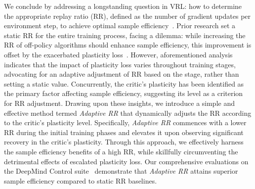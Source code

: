 We conclude by addressing a longstanding question in VRL: how to determine the appropriate replay ratio (RR), defined as the number of gradient updates per environment step, to achieve optimal sample efficiency~\citep{fedus2020revisiting}.
Prior research set a static RR for the entire training process, facing a dilemma: while increasing the RR of off-policy algorithms should enhance sample efficiency, this improvement is offset by the exacerbated plasticity loss~\citep{primacy_bias, dormant_neuron, BBF}.
However, aforementioned analysis indicates that the impact of plasticity loss varies throughout training stages, advocating for an adaptive adjustment of RR based on the stage, rather than setting a static value.
Concurrently, the critic's plasticity has been identified as the primary factor affecting sample efficiency, suggesting its level as a criterion for RR adjustment.
Drawing upon these insights, we introduce a simple and effective method termed \textit{Adaptive RR} that dynamically adjusts the RR according to the critic's plasticity level.
Specifically, \textit{Adaptive RR} commences with a lower RR during the initial training phases and elevates it upon observing significant recovery in the critic's plasticity.
Through this approach, we effectively harness the sample efficiency benefits of a high RR, while skillfully circumventing the detrimental effects of escalated plasticity loss.
Our comprehensive evaluations on the DeepMind Control suite~\citep{DMC_suite} demonstrate that \textit{Adaptive RR} attains superior sample efficiency compared to static RR baselines.




